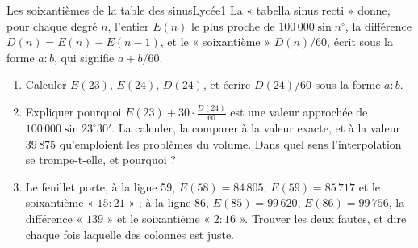 \documentclass[11pt,a4paper]{article}
\begin{document}
\begin{exercice}{Les soixantièmes de la table des sinus}{Lycée}{1}
La « tabella sinus recti » donne, pour chaque degré $n$, l'entier
$E(n)$ le plus proche de $100\,000\sin n^\circ$, la différence
$D(n) = E(n) - E(n-1)$, et le « soixantième » $D(n)/60$, écrit sous la forme
$a{:}b$, qui signifie $a + b/60$.

\begin{enumerate}
\item Calculer $E(23)$, $E(24)$, $D(24)$, et écrire $D(24)/60$ sous la forme
  $a{:}b$.
\item Expliquer pourquoi $E(23) + 30 \cdot \frac{D(24)}{60}$ est une valeur
  approchée de $100\,000 \sin 23^\circ 30'$. La calculer, la comparer à la valeur
  exacte, et à la valeur $39\,875$ qu'emploient les problèmes du volume. Dans
  quel sens l'interpolation se trompe-t-elle, et pourquoi ?
\item Le feuillet porte, à la ligne 59, $E(58) = 84\,805$, $E(59) = 85\,717$ et
  le soixantième « $15{:}21$ » ; à la ligne 86, $E(85) = 99\,620$,
  $E(86) = 99\,756$, la différence « $139$ » et le soixantième « $2{:}16$ ».
  Trouver les deux fautes, et dire chaque fois laquelle des colonnes est juste.
\end{enumerate}
\end{exercice}
\end{document}
